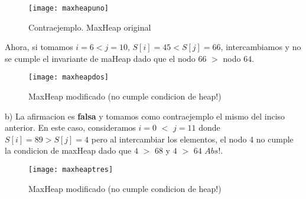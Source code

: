 \documentclass[10pt,a4paper]{article}
\begin{document}
\begin{figure}[h]
	\centering
	\texttt{[image: maxheapuno]}
	\caption{Contraejemplo. MaxHeap original}
	\label{drivers1}
\end{figure}

Ahora, si tomamos $i = 6 < j = 10$, $S[i] = 45 < S[j] = 66$, intercambiamos y no se cumple el invariante de maHeap dado que el nodo 66 $>$ nodo $64$.

\begin{figure}[h]
	\centering
	\texttt{[image: maxheapdos]}
	\caption{MaxHeap modificado (no cumple condicion de heap!)}
	\label{drivers1}
\end{figure}
\newpage

b) La afirmacion es \textbf{falsa} y tomamos como contraejemplo el mismo del inciso anterior. 
\newline
\newline
En este caso, consideramos $i = 0$ $<$ $j=11$ donde $S[i] = 89 > S[j] = 4$ pero al intercambiar los elementos, el nodo 4 no cumple la condicion de maxHeap dado que $4$ $>$ $68$ y $4$ $>$ $64$ $Abs!$.

\begin{figure}[h]
	\centering
	\texttt{[image: maxheaptres]}
	\caption{MaxHeap modificado (no cumple condicion de heap!)}
	\label{drivers1}
\end{figure}
\newpage
\end{document}
